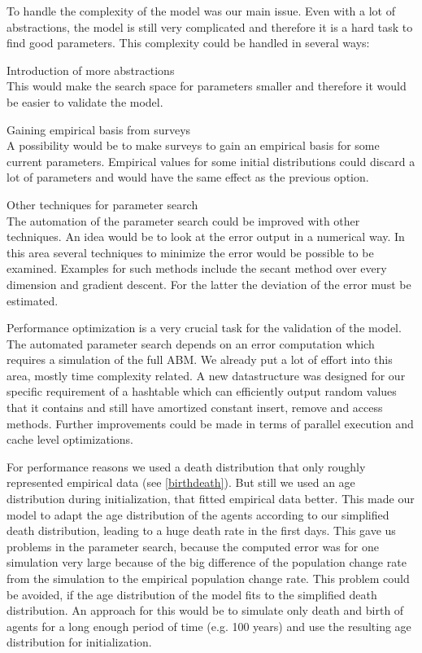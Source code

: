\documentclass{JASSS}
\begin{document}
To handle the complexity of the model was our main issue. Even with a lot of abstractions, the model is still very complicated and therefore it is a hard task to find good parameters. This complexity could be handled in several ways:
\begin{itemize*}
	\item Introduction of more abstractions\\
    This would make the search space for parameters smaller and therefore it would be easier to validate the model.
    \item Gaining empirical basis from surveys\\
    A possibility would be to make surveys to gain an empirical basis for some current parameters.
    Empirical values for some initial distributions could discard a lot of parameters and would have the same effect as the previous option.
    \item Other techniques for parameter search\\
    The automation of the parameter search could be improved with other techniques.
    An idea would be to look at the error output in a numerical way.
    In this area several techniques to minimize the error would be possible to be examined.
    Examples for such methods include the secant method over every dimension and gradient descent.
    For the latter the deviation of the error must be estimated.
\end{itemize*}

Performance optimization is a very crucial task for the validation of the model. The automated parameter search depends on an error computation which requires a simulation of the full ABM. We already put a lot of effort into this area, mostly time complexity related. A new datastructure was designed for our specific requirement of a hashtable which can efficiently output random values that it contains and still have amortized constant insert, remove and access methods.
Further improvements could be made in terms of parallel execution and cache level optimizations.

For performance reasons we used a death distribution that only roughly represented empirical data (see \ref{birthdeath}). But still we used an age distribution during initialization, that fitted empirical data better. This made our model to adapt the age distribution of the agents according to our simplified death distribution, leading to a huge death rate in the first days.
This gave us problems in the parameter search, because the computed error was for one simulation very large because of the big difference of the population change rate from the simulation to the empirical population change rate.
This problem could be avoided, if the age distribution of the model fits to the simplified death distribution. An approach for this would be to simulate only death and birth of agents for a long enough period of time (e.g. 100 years) and use the resulting age distribution for initialization.
\end{document}
